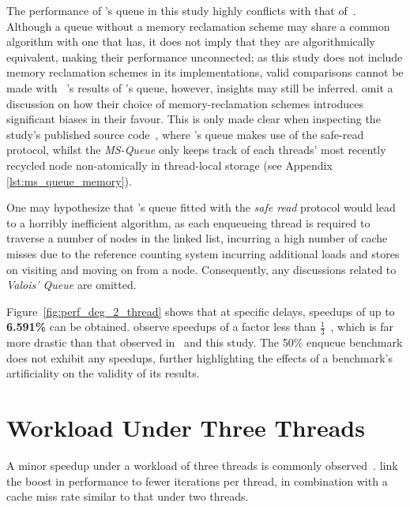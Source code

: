 The performance of \citeauthor{valois1994queues}'s queue in this study highly
conflicts with that of~\citep{michael1996simple}. Although a queue without a
memory reclamation scheme may share a common algorithm with one that has, it
does not imply that they are algorithmically equivalent, making their
performance unconnected; as this study does not include memory reclamation
schemes in its implementations, valid comparisons cannot be made with
~\citep{michael1996simple}'s results of \citeauthor{valois1994queues}'s queue,
however, insights may still be inferred.
\citeauthor{michael1996simple} omit a discussion on how their choice of
memory-reclamation schemes introduces significant biases in their favour. 
This is only made clear when inspecting the study's published source
code~\citep{michael1996simple_sourcecode}, where \citeauthor{valois1994queues}'s queue
makes use of the safe-read protocol, whilst the \emph{MS-Queue} only keeps
track of each threads' most recently recycled node non-atomically in thread-local storage (see Appendix \ref{lst:ms_queue_memory}).

One may hypothesize that \citeauthor{valois1994queues}'s queue fitted with the \emph{safe read}
protocol would lead to a horribly inefficient algorithm, as each enqueueing thread
is required to traverse a number of nodes in the linked list, incurring a high
number of cache misses due to the reference counting system incurring
additional loads and stores on visiting and moving on from a node.
Consequently, any discussions related to \emph{Valois' Queue} are omitted.

Figure~\ref{fig:perf_deg_2_thread} shows that at specific delays, speedups of
up to \textbf{6.591\%} can be obtained.
\citeauthor{michael1996simple} observe speedups of a factor less than
$\frac{1}{3}$~\citep{michael1996simple}, which is far more drastic than that
observed in~\citep{ladan2008optimistic, hoffman2007baskets} and this study. The
50\% enqueue benchmark does not exhibit any speedups, further highlighting the
effects of a benchmark's artificiality on the validity of its results.

\section{Workload Under Three Threads}
A minor speedup under a workload of three threads is commonly
observed~\citep{ladan2008optimistic,michael1996simple,hoffman2007baskets}.
\citeauthor{michael1996simple} link the boost in performance to fewer
iterations per thread, in combination with a cache miss rate similar to that
under two threads.

